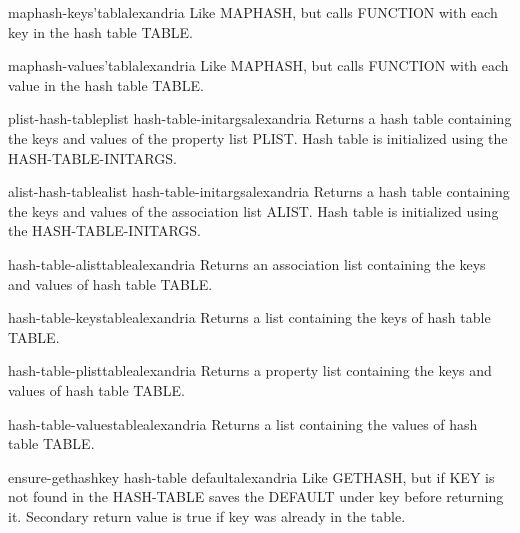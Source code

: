 \begin{function}{maphash-keys}{'tabl}{alexandria}{}
  Like MAPHASH, but calls FUNCTION with each key in the hash table TABLE.
\end{function}

\begin{function}{maphash-values}{'tabl}{alexandria}{}
  Like MAPHASH, but calls FUNCTION with each value in the hash table TABLE.
\end{function}

\begin{function}{plist-hash-table}{plist \rest hash-table-initargs}{alexandria}{}
  Returns a hash table containing the keys and values of the property list
PLIST. Hash table is initialized using the HASH-TABLE-INITARGS.
\end{function}

\begin{function}{alist-hash-table}{alist \rest hash-table-initargs}{alexandria}{}
  Returns a hash table containing the keys and values of the association list
ALIST. Hash table is initialized using the HASH-TABLE-INITARGS.
\end{function}

\begin{function}{hash-table-alist}{table}{alexandria}{}
  Returns an association list containing the keys and values of hash table
TABLE.
\end{function}

\begin{function}{hash-table-keys}{table}{alexandria}{}
  Returns a list containing the keys of hash table TABLE.
\end{function}

\begin{function}{hash-table-plist}{table}{alexandria}{}
  Returns a property list containing the keys and values of hash table
TABLE.
\end{function}

\begin{function}{hash-table-values}{table}{alexandria}{}
  Returns a list containing the values of hash table TABLE.
\end{function}

\begin{function}{ensure-gethash}{key hash-table \op default}{alexandria}{}
  Like GETHASH, but if KEY is not found in the HASH-TABLE saves the DEFAULT
under key before returning it. Secondary return value is true if key was
already in the table.
\end{function}


